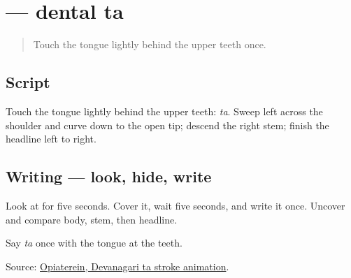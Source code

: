 \section[\texorpdfstring{\mr{त} (ta)}{त (ta)}]{ — dental ta}

\label{lesson:MR-W02-ta}



\begin{quote}
Touch the tongue lightly behind the upper teeth once.
\end{quote}

\subsection*{Script}
\begin{quote}
\end{quote}

Touch the tongue lightly behind the upper teeth: \emph{ta}. Sweep left across the shoulder and curve down to the open tip; descend the right stem; finish the headline left to right.

\subsection*{Writing — look, hide, write}

Look at \textbf{} for five seconds. Cover it, wait five seconds, and write it once. Uncover and compare body, stem, then headline.

\begin{tcolorbox}[breakable,colback=teal!4,colframe=teal!35!black,title={Before you move on}]
Say \emph{ta} once with the tongue at the teeth.

Source: \href{https://commons.wikimedia.org/wiki/File:Deva-\%E0\%A4\%A4-order.gif}{Opiaterein, Devanagari ta stroke animation}.
\end{tcolorbox}
